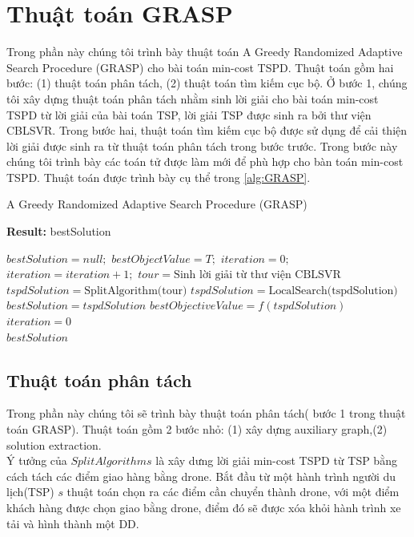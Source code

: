 \documentclass[a4paper,12pt]{report}
\begin{document}
\section{Thuật toán GRASP}
\label{section:grasp}
Trong phần này chúng tôi trình bày thuật toán A Greedy Randomized Adaptive Search Procedure (GRASP) cho bài toán min-cost TSPD. Thuật toán gồm hai bước: (1) thuật toán phân tách, (2) thuật toán tìm kiếm cục bộ. Ở bước 1, chúng tôi xây dựng thuật toán phân tách nhằm sinh lời giải cho bài toán min-cost TSPD từ lời giải của bài toán TSP, lời giải TSP được sinh ra bởi thư viện CBLSVR. Trong bước hai, thuật toán tìm kiếm cục bộ được sử dụng để cải thiện lời giải được sinh ra từ thuật toán phân tách trong bước trước. Trong bước này chúng tôi trình bày các toán tử được làm mới để phù hợp cho bàn toán min-cost TSPD. Thuật toán được trình bày cụ thể trong \ref{alg:GRASP}.
\begin{algorithm}[H]
\caption{A Greedy Randomized Adaptive Search Procedure (GRASP)}
\textbf{Result:} bestSolution
\begin{algorithmic}[1]
\State $bestSolution=null;$
\State $bestObjectValue=T;$
\State $iteration=0;$
\State $iteration=iteration+1;$
\State $tour=\text{Sinh lời giải từ thư viện CBLSVR}$
\State $tspdSolution=\text{SplitAlgorithm(tour)}$
\State $tspdSolution=\text{LocalSearch(tspdSolution)}$
\State $bestSolution=tspdSolution$
\State $bestObjectiveValue=f(tspdSolution)$
\State $iteration=0$
\EndIf
\EndWhile\\
\Return $bestSolution$
\end{algorithmic}
\label{alg:GRASP}
\end{algorithm}
\subsection{Thuật toán phân tách}
Trong phần này chúng tôi sẽ trình bày thuật toán phân tách( bước 1 trong thuật toán GRASP). Thuật toán gồm 2 bước nhỏ: (1) xây dựng auxiliary graph,(2) solution extraction. \\

Ý tưởng của $SplitAlgorithms$ là xây dưng lời giải min-cost TSPD từ TSP bằng cách tách các điểm giao hàng bằng drone. Bắt đầu từ một hành trình người du lịch(TSP) $s$ thuật toán chọn ra các điểm cần chuyển thành drone, với một điểm khách hàng được chọn giao bằng drone, điểm đó sẽ được xóa khỏi hành trình xe tải và hình thành một DD.
\end{document}
